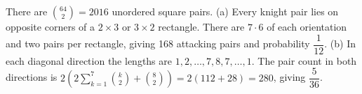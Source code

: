 There are $\binom{64}{2}=2016$ unordered square pairs. (a) Every knight pair lies on opposite corners of a $2\times3$ or $3\times2$ rectangle. There are $7\cdot6$ of each orientation and two pairs per rectangle, giving 168 attacking pairs and probability $\boxed{\dfrac{1}{12}}$. (b) In each diagonal direction the lengths are $1,2,\ldots,7,8,7,\ldots,1$. The pair count in both directions is $2\left(2\sum_{k=1}^7\binom k2+\binom82\right)=2(112+28)=280$, giving $\boxed{\dfrac{5}{36}}$.
